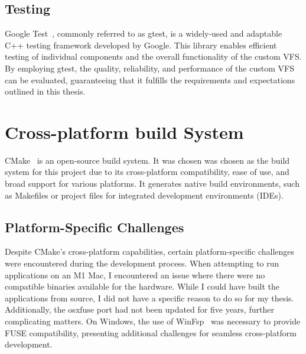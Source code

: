 \subsection{Testing}\label{subsec:gtest}

Google Test~\cite{google_test}, commonly referred to as gtest, is a widely-used and adaptable C++ testing framework developed by Google.
This library enables efficient testing of individual components and the overall functionality of the custom VFS\@.
By employing gtest, the quality, reliability, and performance of the custom VFS can be evaluated, guaranteeing that it fulfills the requirements and expectations outlined in this thesis.

\section{Cross-platform build System}\label{sec:build-system-and-cross-platform-challenges}

CMake~\cite{cmake} is an open-source build system.
It was chosen was chosen as the build system for this project due to its cross-platform compatibility, ease of use, and broad support for various platforms.
It generates native build environments, such as Makefiles or project files for integrated development environments (IDEs).

\subsection{Platform-Specific Challenges}\label{subsec:platform-specific-challenges}

Despite CMake's cross-platform capabilities, certain platform-specific challenges were encountered during the development process.
When attempting to run applications on an M1 Mac, I encountered an issue where there were no compatible binaries available for the hardware.
While I could have built the applications from source, I did not have a specific reason to do so for my thesis.
Additionally, the osxfuse port had not been updated for five years, further complicating matters.
On Windows, the use of WinFsp~\cite{winfsp} was necessary to provide FUSE compatibility, presenting additional challenges for seamless cross-platform development.